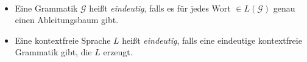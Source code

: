 %   

\begin{Def}[name={[Eindeutigkeit von \acs*{CFG} und \acs*{CFL}]}]\
	\begin{itemize}
  \item Eine Grammatik $\mathcal{G}$ heißt \emph{eindeutig}, falls es für jedes Wort $\in L(\mathcal{G})$ genau einen Ableitungsbaum gibt.
	\item Eine kontextfreie Sprache $L$ heißt \emph{eindeutig}, falls eine eindeutige kontextfreie Grammatik gibt, die $L$ erzeugt. \qedhere
	\end{itemize}
\end{Def}

